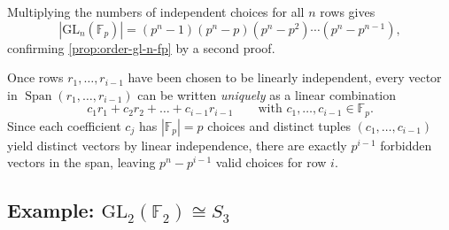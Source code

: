 \begin{proofWrapper}
\begin{content}
\begin{center}
\end{center}

Multiplying the numbers of independent choices for all $n$ rows gives
\[
\left|\mathrm{GL}_n(\mathbb{F}_p)\right| = (p^n - 1)(p^n - p)(p^n - p^2) \cdots (p^n - p^{n-1}),
\]
confirming \cref{prop:order-gl-n-fp} by a second proof.

\begin{steps}
Once rows $r_1, \dots, r_{i-1}$ have been chosen to be linearly independent, every vector in $\operatorname{Span}(r_1, \dots, r_{i-1})$ can be written \emph{uniquely} as a linear combination
\[
c_1 r_1 + c_2 r_2 + \dots + c_{i-1} r_{i-1} \qquad \text{with } c_1, \dots, c_{i-1} \in \mathbb{F}_p.
\]
Since each coefficient $c_j$ has $|\mathbb{F}_p| = p$ choices and distinct tuples $(c_1, \dots, c_{i-1})$ yield distinct vectors by linear independence, there are exactly $p^{i-1}$ forbidden vectors in the span, leaving $p^n - p^{i-1}$ valid choices for row $i$.
\end{steps}
\end{content}

\end{proofWrapper}

\begin{hidden}
\end{hidden}

\subsection{Example: \texorpdfstring{$\mathrm{GL}_2(\mathbb{F}_2) \cong S_3$}{GL\_2(F\_2) cong S\_3}}

